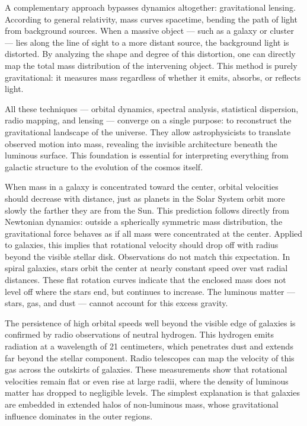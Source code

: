 A complementary approach bypasses dynamics altogether: gravitational lensing. According to general relativity, mass curves spacetime, bending the path of light from background sources. When a massive object — such as a galaxy or cluster — lies along the line of sight to a more distant source, the background light is distorted. By analyzing the shape and degree of this distortion, one can directly map the total mass distribution of the intervening object. This method is purely gravitational: it measures mass regardless of whether it emits, absorbs, or reflects light.

All these techniques — orbital dynamics, spectral analysis, statistical dispersion, radio mapping, and lensing — converge on a single purpose: to reconstruct the gravitational landscape of the universe. They allow astrophysicists to translate observed motion into mass, revealing the invisible architecture beneath the luminous surface. This foundation is essential for interpreting everything from galactic structure to the evolution of the cosmos itself.

When mass in a galaxy is concentrated toward the center, orbital velocities should decrease with distance, just as planets in the Solar System orbit more slowly the farther they are from the Sun. This prediction follows directly from Newtonian dynamics: outside a spherically symmetric mass distribution, the gravitational force behaves as if all mass were concentrated at the center. Applied to galaxies, this implies that rotational velocity should drop off with radius beyond the visible stellar disk. Observations do not match this expectation. In spiral galaxies, stars orbit the center at nearly constant speed over vast radial distances. These flat rotation curves indicate that the enclosed mass does not level off where the stars end, but continues to increase. The luminous matter — stars, gas, and dust — cannot account for this excess gravity.

The persistence of high orbital speeds well beyond the visible edge of galaxies is confirmed by radio observations of neutral hydrogen. This hydrogen emits radiation at a wavelength of 21 centimeters, which penetrates dust and extends far beyond the stellar component. Radio telescopes can map the velocity of this gas across the outskirts of galaxies. These measurements show that rotational velocities remain flat or even rise at large radii, where the density of luminous matter has dropped to negligible levels. The simplest explanation is that galaxies are embedded in extended halos of non-luminous mass, whose gravitational influence dominates in the outer regions.

